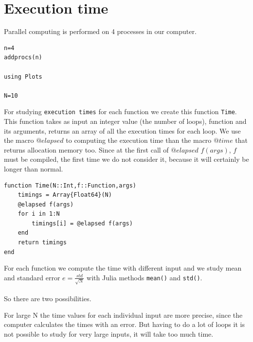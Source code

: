 \documentclass{article}
\begin{document}

\section{Execution time}
Parallel computing is performed on 4 processes in our computer. 

\begin{flushleft}\small
\begin{list}{}{} \item
   \begin{Verbatim}[tabsize=4]
n=4
addprocs(n)

using Plots

N=10
   \end{Verbatim}
\end{list}
\end{flushleft}
\vspace{2ex}
For studying \texttt{execution times} for each function we create this function \texttt{Time}.
This function takes as input an integer value (the number of loops), function and its arguments, returns an array of all the execution times for each loop. 
We use the macro $@elapsed$ to computing the execution time than the macro $@time$ that returns allocation memory too.  
Since at the first call of $@elapsed$ $f(args)$, $f$ must be compiled, the first time we do not consider it, because it will certainly be longer than normal.

\begin{list}{}{} \item
   \begin{Verbatim}[tabsize=4]
function Time(N::Int,f::Function,args)
	timings = Array{Float64}(N)
	@elapsed f(args)
	for i in 1:N
		timings[i] = @elapsed f(args)
	end
	return timings
end
   \end{Verbatim}
\end{list}
\vspace{2ex}
For each function we compute the time with different input and we study mean and standard error $ e=\frac{std}{\sqrt{N}}$ with Julia methods \texttt{mean()} and \texttt{std()}.
\\
\\
So there are two possibilities.

For large N the time values for each individual input are more precise, since the computer calculates the times with an error. But having to do a lot of loops it is not possible to study for very large inputs, it will take too much time.
\end{document}
